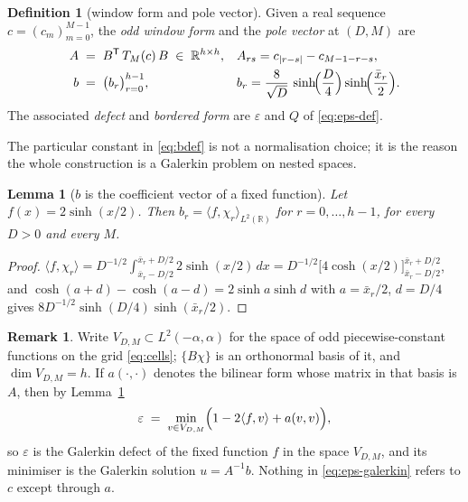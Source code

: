 \documentclass[11pt,a4paper]{article}
\theoremstyle{plain}
\newtheorem{lemma}[theorem]{Lemma}
\theoremstyle{definition}
\newtheorem{definition}[theorem]{Definition}
\newtheorem{remark}[theorem]{Remark}
\newcommand{\R}{\mathbb{R}}
\newcommand{\T}{\mathsf{T}}
\newcommand{\Tm}[1]{T_{#1}}
\begin{document}
\begin{definition}[window form and pole vector]
\label{def:window}
Given a real sequence $c=(c_{m})_{m=0}^{M-1}$, the \emph{odd window form} and the
\emph{pole vector} at $(D,M)$ are
\begin{align}
\label{eq:Adef}
  A &\;=\; B^{\T}\,\Tm{M}(c)\,B \;\in\;\R^{h\times h},
  &&A_{rs}=c_{|r-s|}-c_{M-1-r-s},\\
\label{eq:bdef}
  b &\;=\; \bigl(b_{r}\bigr)_{r=0}^{h-1},
  &&b_{r}=\frac{8}{\sqrt D}\,\sinh\!\Bigl(\frac D4\Bigr)\sinh\!\Bigl(\frac{\bar x_{r}}{2}\Bigr).
\end{align}
The associated \emph{defect} and \emph{bordered form} are $\varepsilon$ and $Q$ of
\eqref{eq:eps-def}.
\end{definition}

The particular constant in \eqref{eq:bdef} is not a normalisation choice; it is the
reason the whole construction is a Galerkin problem on nested spaces.

\begin{lemma}[$b$ is the coefficient vector of a fixed function]
\label{lem:bcoeff}
Let $f(x)=2\sinh(x/2)$. Then $b_{r}=\langle f,\chi_{r}\rangle_{L^{2}(\R)}$ for
$r=0,\dots,h-1$, for every $D>0$ and every $M$.
\end{lemma}

\begin{proof}
$\langle f,\chi_{r}\rangle
 =D^{-1/2}\int_{\bar x_{r}-D/2}^{\bar x_{r}+D/2}2\sinh(x/2)\,dx
 =D^{-1/2}\bigl[4\cosh(x/2)\bigr]_{\bar x_{r}-D/2}^{\bar x_{r}+D/2}$,
and $\cosh(a+d)-\cosh(a-d)=2\sinh a\sinh d$ with $a=\bar x_{r}/2$, $d=D/4$ gives
$8D^{-1/2}\sinh(D/4)\sinh(\bar x_{r}/2)$.
\end{proof}

\begin{remark}
\label{rem:galerkin}
Write $V_{D,M}\subset L^{2}(-\alpha,\alpha)$ for the space of odd piecewise-constant
functions on the grid \eqref{eq:cells}; $\{B\chi\}$ is an orthonormal basis of it, and
$\dim V_{D,M}=h$. If $a(\cdot,\cdot)$ denotes the bilinear form whose matrix in that
basis is $A$, then by Lemma~\ref{lem:bcoeff}
\begin{equation}
\label{eq:eps-galerkin}
  \varepsilon \;=\; \min_{v\in V_{D,M}}\Bigl(1-2\langle f,v\rangle+a(v,v)\Bigr),
\end{equation}
so $\varepsilon$ is the Galerkin defect of the fixed function $f$ in the space
$V_{D,M}$, and its minimiser is the Galerkin solution $u=A^{-1}b$. Nothing in
\eqref{eq:eps-galerkin} refers to $c$ except through $a$.
\end{remark}
\end{document}
